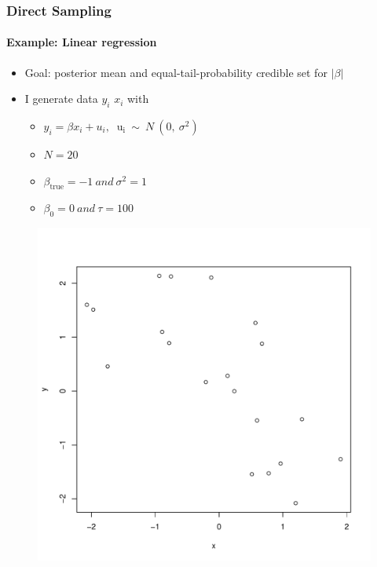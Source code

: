 \documentclass[
  shownotes,
  xcolor={svgnames},
  hyperref={colorlinks,citecolor=DarkBlue,linkcolor=DarkRed,urlcolor=DarkBlue}
  , aspectratio=169]{beamer}
\begin{document}
\begin{frame}[fragile]
\frametitle{Direct Sampling}
\framesubtitle{Example: Linear regression}

\begin{itemize}
\item Goal: posterior mean and equal-tail-probability credible set for $|\beta|$
\medskip


\item I generate data $y_{i}$ $x_{i}$ with
\begin{itemize}
\item $ y_{i} = \beta x_{i} + u_{i},\ \text{\ \ u}_{\text{i\ }}\sim\ N\ (0,\ \sigma^{2})$

\item $N = 20$

\item $\beta_{\text{true}} = - 1\ and\ \sigma^{2} = 1$

\item $\beta_{0} = 0\ and\ \tau = 100$
\end{itemize}
\end{itemize}

\begin{figure}[H] \centering
  \centering
  \includegraphics[scale=0.25]{figures/scatter}
  \\
  \tiny 
\end{figure}
\end{frame}
\end{document}
